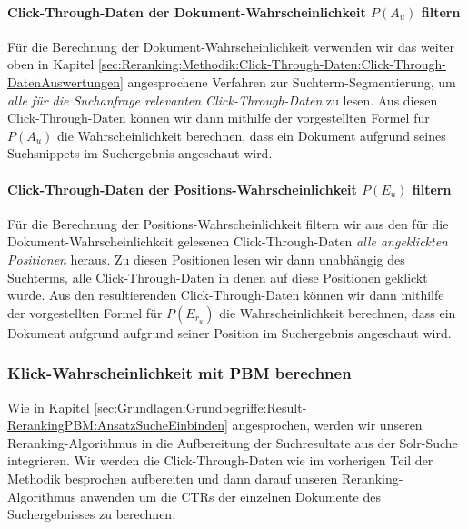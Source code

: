 \paragraph{Click-Through-Daten der Dokument-Wahrscheinlichkeit $P(A_{u})$ filtern}
Für die Berechnung der Dokument-Wahrscheinlichkeit verwenden wir das weiter oben in Kapitel \ref{sec:Reranking:Methodik:Click-Through-Daten:Click-Through-DatenAuswertungen} angesprochene Verfahren zur Suchterm-Segmentierung, um \textit{alle für die Suchanfrage relevanten Click-Through-Daten} zu lesen. Aus diesen Click-Through-Daten können wir dann mithilfe der vorgestellten Formel für $P(A_{u})$ die Wahrscheinlichkeit berechnen, dass ein Dokument aufgrund seines Suchsnippets im Suchergebnis angeschaut wird.  

\paragraph{Click-Through-Daten der Positions-Wahrscheinlichkeit $P(E_{u})$ filtern}
Für die Berechnung der Positions-Wahrscheinlichkeit filtern wir aus den für die Dokument-Wahrscheinlichkeit
gelesenen Click-Through-Daten \textit{alle angeklickten Positionen} heraus. Zu diesen Positionen lesen wir dann unabhängig des Suchterms, alle Click-Through-Daten in denen auf diese Positionen geklickt wurde. Aus den resultierenden Click-Through-Daten können wir dann mithilfe der vorgestellten Formel für $P(E_{r_{u}})$ die Wahrscheinlichkeit berechnen, dass ein Dokument aufgrund aufgrund seiner Position im Suchergebnis angeschaut wird.

\subsubsection{Klick-Wahrscheinlichkeit mit PBM berechnen}
\label{sec:Reranking:Methodik:Result-RerankingPBM:Klick-Wahrscheinlichkeit}

Wie in Kapitel \ref{sec:Grundlagen:Grundbegriffe:Result-RerankingPBM:AnsatzSucheEinbinden} angesprochen, werden wir unseren Reranking-Algorithmus in die Aufbereitung der Suchresultate aus der Solr-Suche integrieren. Wir werden die Click-Through-Daten wie im vorherigen Teil der Methodik besprochen aufbereiten und dann darauf unseren Reranking-Algorithmus anwenden um die CTRs der einzelnen Dokumente des Suchergebnisses zu berechnen. 

